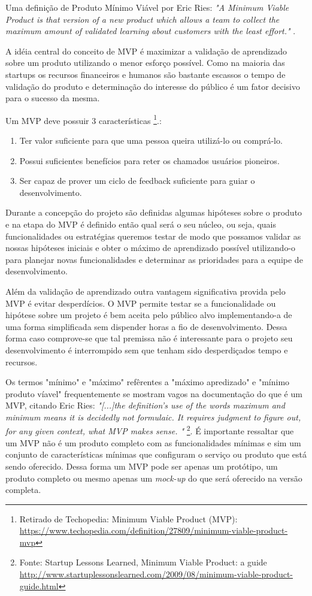 \par Uma definição de Produto Mínimo Viável por Eric Ries:
\emph{"A Minimum Viable Product is that version of a new product which allows a team to collect the maximum amount of validated learning about customers with the least effort."} \cite{ries:11}.
    \par A idéia central do conceito de MVP é maximizar a validação de aprendizado sobre um produto utilizando o menor esforço possível. Como na maioria das startups os recursos financeiros e humanos são bastante escassos o tempo de validação do produto e determinação do interesse do público é um fator decisivo para o sucesso da mesma.
    \par Um MVP deve possuir 3 características \footnote{ Retirado de Techopedia: Minimum Viable Product (MVP): \url{https://www.techopedia.com/definition/27809/minimum-viable-product-mvp}}.:
    \begin{enumerate}
        \item Ter valor suficiente para que uma pessoa queira utilizá-lo ou comprá-lo.
        \item Possui suficientes benefícios para reter os chamados usuários pioneiros.
        \item Ser capaz de prover um ciclo de feedback suficiente para guiar o desenvolvimento.
\end{enumerate}
    \par Durante a concepção do projeto são definidas algumas hipóteses sobre o produto e na etapa do MVP é definido então qual será o seu núcleo, ou seja, quais funcionalidades ou estratégias queremos testar de modo que possamos validar  as nossas hipóteses iniciais e obter o máximo de aprendizado possível utilizando-o para planejar novas funcionalidades e determinar as prioridades para a equipe de desenvolvimento.
    \par Além da validação de aprendizado outra vantagem significativa provida pelo MVP é evitar desperdícios. O MVP permite testar se a funcionalidade ou hipótese sobre um projeto é bem aceita pelo público alvo implementando-a de uma forma simplificada sem dispender horas a fio de desenvolvimento. Dessa forma caso comprove-se que tal premissa não é interessante para o projeto seu desenvolvimento é interrompido sem que tenham sido desperdiçados tempo e recursos.
    \par Os termos "mínimo" e "máximo" refêrentes a "máximo apredizado" e "mínimo produto víavel" frequentemente se mostram vagos na documentação do que é um MVP, citando Eric Ries: \emph{"[...]the definition's use of the words maximum and minimum means it is decidedly not formulaic. It requires judgment to figure out, for any given context, what MVP makes sense. "} \footnote{Fonte: Startup Lessons Learned, Minimum Viable Product: a guide \url{http://www.startuplessonslearned.com/2009/08/minimum-viable-product-guide.html}}. É importante ressaltar que um MVP não é um produto completo com as funcionalidades  mínimas e sim um conjunto de características mínimas que configuram o serviço ou produto que está sendo oferecido. Dessa forma um MVP pode ser apenas um protótipo, um produto completo ou mesmo apenas um \emph{mock-up} do que será oferecido na versão completa.

